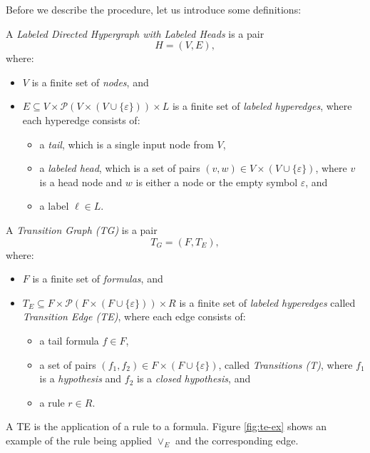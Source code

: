Before we describe the procedure, let us introduce some definitions:
\begin{definition}
A \emph{Labeled Directed Hypergraph with Labeled Heads} is a pair
\[
H = (V, E),
\]
where:
\begin{itemize}
  \item \( V \) is a finite set of \emph{nodes}, and
  \item \( E \subseteq V \times \mathcal{P}(V \times (V \cup \{\varepsilon\})) \times L \) is a finite set of \emph{labeled hyperedges}, where each hyperedge consists of:
  \begin{itemize}
    \item a \emph{tail}, which is a single input node from \( V \),
    \item a \emph{labeled head}, which is a set of pairs \( (v, w) \in V \times (V \cup \{\varepsilon\}) \), where \( v \) is a head node and \( w \) is either a node or the empty symbol \( \varepsilon \), and
    \item a label \( \ell \in L \).
  \end{itemize}
\end{itemize}
\end{definition}

\begin{definition}
A \emph{Transition Graph (TG)} is a pair
\[
T_G = (F, T_E),
\]
where:
\begin{itemize}
  \item \( F \) is a finite set of \emph{formulas}, and
  \item \( T_E \subseteq F \times \mathcal{P}(F \times (F \cup \{\varepsilon\})) \times R \) is a finite set of \emph{labeled hyperedges} called \emph{Transition Edge (TE)}, where each edge consists of:
  \begin{itemize}
    \item a tail formula \( f \in F \),
    \item a set of pairs \( (f_1, f_2) \in F \times (F \cup \{\varepsilon\}) \), called \emph{Transitions (T)}, where \( f_1 \) is a \emph{hypothesis} and \( f_2 \) is a \emph{closed hypothesis}, and
    \item a rule \( r \in R \).
  \end{itemize}
\end{itemize}
\end{definition}

A TE is the application of a rule to a formula. Figure \ref{fig:te-ex} shows an example of the rule being applied \(\vee_E\) and the corresponding edge.

